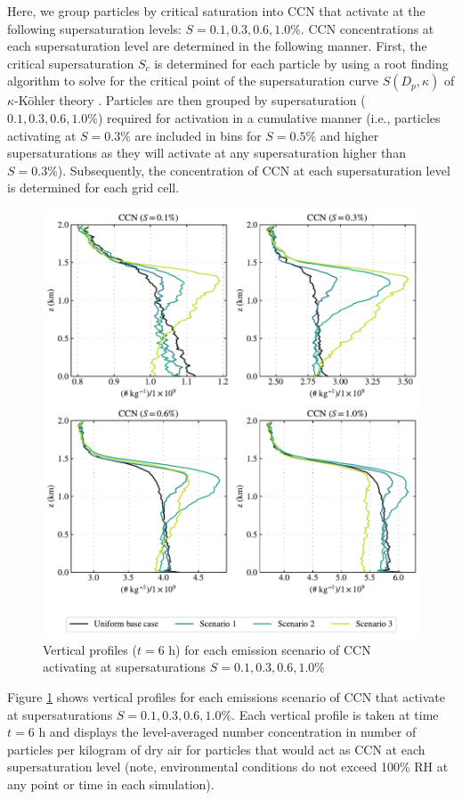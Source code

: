 Here, we group particles by critical saturation into CCN that activate at the following supersaturation levels:  $S=0.1, 0.3, 0.6, 1.0\%$. CCN concentrations at each supersaturation level are determined in the following manner. First, the critical supersaturation $S_c$ is determined for each particle by using a root finding algorithm to solve for the critical point of the supersaturation curve $S(D_p, \kappa)$ of $\kappa$-Köhler theory \parencite{petters_single_2007}. Particles are then grouped by supersaturation ($0.1, 0.3, 0.6, 1.0\%$) required for activation in a cumulative manner (i.e., particles activating at $S=0.3\%$ are included in bins for $S=0.5\%$ and higher supersaturations as they will activate at any supersaturation higher than $S=0.3\%$). Subsequently, the concentration of CCN at each supersaturation level is determined for each grid cell. 

\begin{figure}[!t]
  \centering
    \includegraphics[width=.9\textwidth]{figures/chapter5/aerosol-ccn-vertical-profiles-time36.pdf}
    \caption{Vertical profiles ($t=6$ h) for each emission scenario of CCN activating at supersaturations $S=0.1, 0.3, 0.6, 1.0$\%}
    \label{fig:vertprof-ccn}
\end{figure}

Figure \ref{fig:vertprof-ccn} shows vertical profiles for each emissions scenario of CCN that activate at supersaturations $S=0.1, 0.3, 0.6, 1.0\%$. Each vertical profile is taken at time $t=6$ h and displays the level-averaged number concentration in number of particles per kilogram of dry air for particles that would act as CCN at each supersaturation level (note, environmental conditions do not exceed 100\% RH at any point or time in each simulation). 

